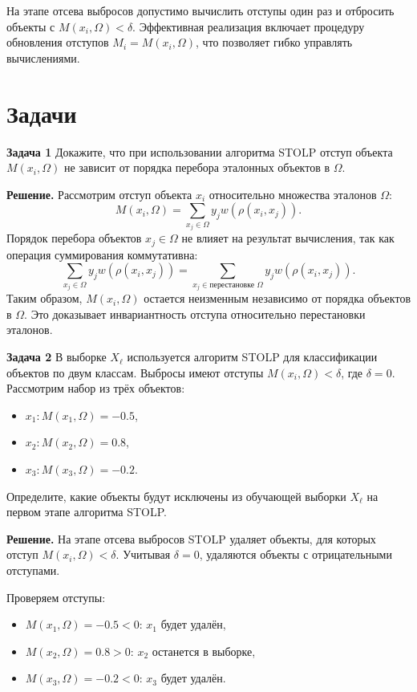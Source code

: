 На этапе отсева выбросов допустимо вычислить отступы один раз и отбросить объекты с \( M(x_i, \Omega) < \delta \). Эффективная реализация включает процедуру обновления отступов \( M_i = M(x_i, \Omega) \), что позволяет гибко управлять вычислениями.

\section{Задачи}

\textbf{Задача 1}
Докажите, что при использовании алгоритма STOLP отступ объекта \(M(x_i, \Omega)\) не зависит от порядка перебора эталонных объектов в \( \Omega \).

\textbf{Решение.}  
Рассмотрим отступ объекта \(x_i\) относительно множества эталонов \( \Omega \):
\[
M(x_i, \Omega) = \sum_{x_j \in \Omega} y_j w(\rho(x_i, x_j)).
\]
Порядок перебора объектов \(x_j \in \Omega\) не влияет на результат вычисления, так как операция суммирования коммутативна:
\[
\sum_{x_j \in \Omega} y_j w(\rho(x_i, x_j)) = \sum_{x_j \in \text{перестановке } \Omega} y_j w(\rho(x_i, x_j)).
\]
Таким образом, \(M(x_i, \Omega)\) остается неизменным независимо от порядка объектов в \( \Omega \). Это доказывает инвариантность отступа относительно перестановки эталонов.

\textbf{Задача 2}
В выборке \(X_\ell\) используется алгоритм STOLP для классификации объектов по двум классам. Выбросы имеют отступы \(M(x_i, \Omega) < \delta\), где \(\delta = 0\). Рассмотрим набор из трёх объектов:  
\begin{itemize}
    \item \(x_1: M(x_1, \Omega) = -0.5\),  
    \item \(x_2: M(x_2, \Omega) = 0.8\),  
    \item \(x_3: M(x_3, \Omega) = -0.2\).
\end{itemize}  
Определите, какие объекты будут исключены из обучающей выборки \(X_\ell\) на первом этапе алгоритма STOLP.

\textbf{Решение.}  
На этапе отсева выбросов STOLP удаляет объекты, для которых отступ \(M(x_i, \Omega) < \delta\). Учитывая \(\delta = 0\), удаляются объекты с отрицательными отступами.  

Проверяем отступы:  
\begin{itemize}
    \item \(M(x_1, \Omega) = -0.5 < 0\): \(x_1\) будет удалён,  
    \item \(M(x_2, \Omega) = 0.8 > 0\): \(x_2\) останется в выборке,  
    \item \(M(x_3, \Omega) = -0.2 < 0\): \(x_3\) будет удалён.  
\end{itemize}

